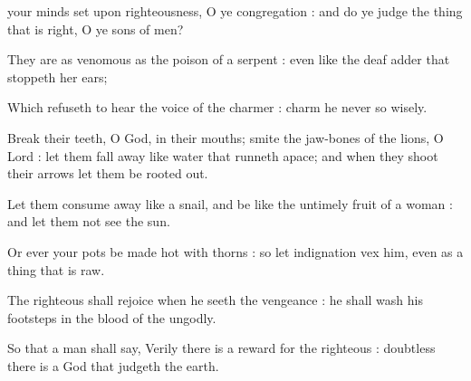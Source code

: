  your minds set upon righteousness, O ye congregation : and do ye judge the thing that is right, O ye sons of men?\par
{}
They are as venomous as the poison of a serpent : even like the deaf adder that stoppeth her ears;\par
{}Which refuseth to hear the voice of the charmer : charm he never so wisely.\par
{}Break their teeth, O God, in their mouths; smite the jaw-bones of the lions, O Lord : let them fall away like water that runneth apace; and when they shoot their arrows let them be rooted out.\par
{}Let them consume away like a snail, and be like the untimely fruit of a woman : and let them not see the sun.\par
{}Or ever your pots be made hot with thorns : so let indignation vex him, even as a thing that is raw.\par
{}The righteous shall rejoice when he seeth the vengeance : he shall wash his footsteps in the blood of the ungodly.\par
{}So that a man shall say, Verily there is a reward for the righteous : doubtless there is a God that judgeth the earth.\par



